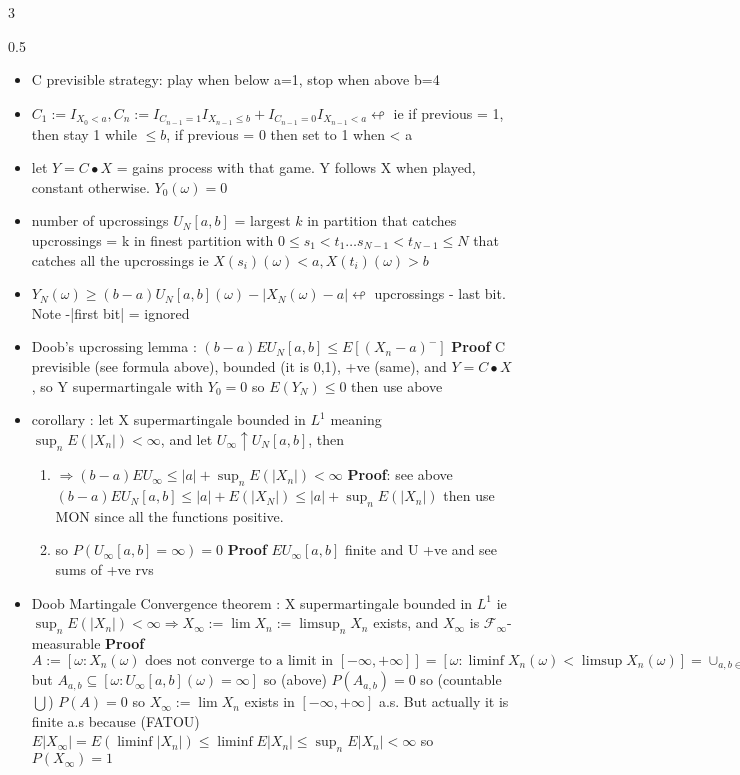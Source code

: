 \documentclass[10pt,landscape,a4paper]{article}
\newcommand{\myFF}{\mathcal{F}}
\begin{document}
\begin{multicols*}{3}
\begin{spacing}{0.5}
\begin{itemize}
\item C previsible strategy: play when below a=1, stop when above b=4
\item $C_1 := I_{X_0<a}, C_n := I_{C_{n-1}=1} I_{X_{n-1} \le b} + I_{C_{n-1}=0} I_{X_{n-1} < a} \looparrowleft $ ie if previous = 1, then stay 1 while $\le b$, if previous = 0 then set to 1 when < a
\item let $Y = C \bullet X$ = gains process with that game. Y follows X when played, constant otherwise. $Y_0(\omega)=0$
\item number of upcrossings $U_N[a,b]$ = largest $k$ in partition that catches upcrossings = k in finest partition with $0 \le s_1 < t_1 \ldots s_{N-1} < t_{N-1} \le N$ that catches all the upcrossings ie $X(s_i)(\omega) < a,X(t_i)(\omega) > b$
\item $Y_N(\omega) \ge (b-a) U_N[a,b](\omega) - |X_N(\omega)-a| \looparrowleft $ upcrossings - last bit. Note -|first bit| = ignored
\item \colorbox{green!10}{Doob's upcrossing lemma} : $(b-a)EU_N[a,b] \le E[{(X_n-a)}^-]$ \textbf{Proof}  C previsible (see formula above), bounded (it is 0,1), +ve (same), and $Y=C \bullet X$, so Y supermartingale with $Y_0=0$ so $E(Y_N) \le 0$ then use above
\item corollary : let X supermartingale bounded in $L^1$ meaning $\sup_n E(|X_n|) < \infty$, and let $U_{\infty} \uparrow U_N[a,b]$, then 
\begin{enumerate}
\item \colorbox{green!10}{ $ \Rightarrow (b-a)EU_{\infty} \le |a| + \sup_n E(|X_n|) < \infty$} \textbf{Proof}: see above $(b-a) EU_N[a,b] \le |a| + E(|X_N|) \le |a| + \sup_n E(|X_n|)$ then use MON since all the functions positive.
\item so \colorbox{green!10}{ $P(U_{\infty}[a,b]=\infty)=0$ } \textbf{Proof} $EU_{\infty}[a,b]$ finite and U +ve and see sums of +ve rvs
\end{enumerate}
\item \colorbox{green!30}{Doob Martingale Convergence theorem} :  X supermartingale bounded in $L^1$ ie $\sup_n E(|X_n|) < \infty \Rightarrow X_{\infty} := \lim X_n := \limsup_n X_n $ exists, and $X_{\infty}$ is $\myFF_{\infty}$-measurable \textbf{Proof} $A := [\omega : X_n(\omega) \text{ does not converge to a limit in } [-\infty,+\infty] ] = [\omega : \liminf X_n(\omega) < \limsup X_n(\omega)] = \cup_{a,b \in \mathbb{Q}, a<b} [w : \liminf X_n(\omega) < a < b < \limsup X_n(\omega)] := \bigcup A_{a,b}$ but $A_{a,b} \subseteq [\omega : U_{\infty}[a,b](\omega)=\infty]$ so (above) $P(A_{a,b})=0$ so (countable $\bigcup$) $P(A)=0$ so $X_{\infty} := \lim X_n$ exists in $[-\infty,+\infty]$ a.s. But actually it is finite a.s because (FATOU) $E|X_{\infty}| = E(\liminf |X_n|) \le \liminf E |X_n| \le \sup_n E|X_n| < \infty$ so $P(X_{\infty})=1$


\end{itemize}
\end{spacing}
\end{multicols*}
\end{document}
